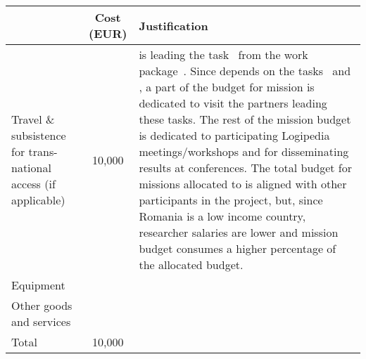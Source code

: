 \begin{longtable*}{|p{.25\textwidth}|c|p{0.55\textwidth}|}
\hline
   & Cost (EUR)  & Justification \\
  \hline
  Travel \& subsistence for trans-national access (if applicable) & 10,000 &

   is leading the task~ from the
work package~.
Since  depends on the
tasks~ and ,
a part of the budget for mission is dedicated to visit the partners leading
these tasks.  The rest of the mission budget is dedicated to
 participating Logipedia meetings/workshops
 and for disseminating results at conferences.
 The total budget for missions allocated to
 is aligned with other participants in the
project, but, since Romania is a low income country, researcher salaries
are lower and mission budget consumes a higher percentage of the
allocated budget.
  \\
  \hline
  Equipment & & \\
  \hline
  Other goods and services & & \\
  \hline
  Total & 10,000 & \\
  \hline
\end{longtable*}


